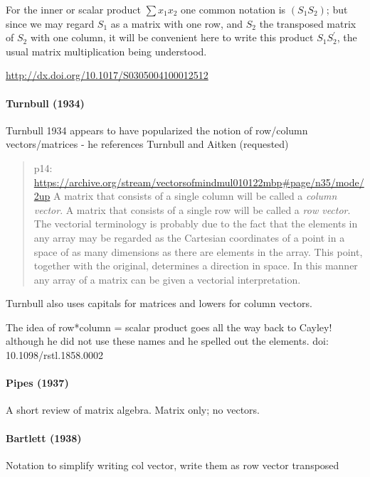 For the
inner or scalar product $\sum x_1 x_2 $
 one common notation is $(S_1 S_2)$; but
since we may regard $S_1$ as a matrix with one row, and $S_2$ the
transposed matrix of $S_2$ with one column, it will be convenient here
to write this product $S_1 S_2^\prime$, the usual matrix multiplication being
understood.

\url{http://dx.doi.org/10.1017/S0305004100012512}



\paragraph{Turnbull (1934)}

Turnbull 1934 appears to have popularized the notion of row/column vectors/matrices - he references Turnbull and Aitken (requested)

\begin{quote}
p14: \url{https://archive.org/stream/vectorsofmindmul010122mbp#page/n35/mode/2up}
A matrix that consists of a single column will be called a \textit{column vector}. A
matrix that consists of a single row will be called a \textit{row vector}. The
vectorial terminology is probably due to the fact that the elements in any
array may be regarded as the Cartesian coordinates of a point in a space of as
many dimensions as there are elements in the array. This point, together with
the original, determines a direction in space. In this manner any array of a
matrix can be given a vectorial interpretation.
\end{quote}

Turnbull also uses capitals for matrices and lowers for column vectors.

The idea of row*column = scalar product goes all the way back to Cayley! although he did not use these names and he spelled out the elements.
doi: 10.1098/rstl.1858.0002

\paragraph{Pipes (1937)~\cite{Pipes1937}}

A short review of matrix algebra. Matrix only; no vectors.


\paragraph{Bartlett (1938)}

Notation to simplify writing col vector, write them as row vector transposed

